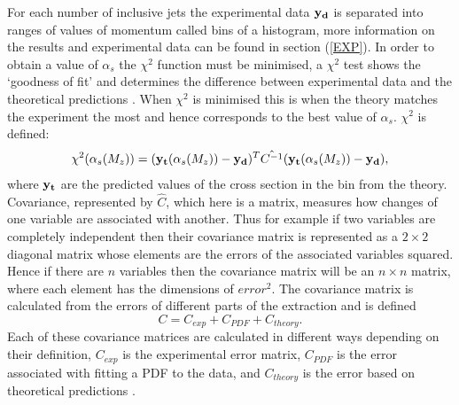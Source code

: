 \documentclass[12pt, onecolumn, nofootinbib]{revtex4}    %
\begin{document}
For each number of inclusive jets the experimental data ${\bold{y_d}}$ is separated into ranges of values of momentum called bins of a histogram, more information on the results and experimental data can be found in section (\ref{EXP}). In order to obtain a value of ${\alpha_s}$ the ${\chi^2}$ function must be minimised, a ${\chi^2}$ test shows the `goodness of fit' and determines the difference between experimental data and the theoretical predictions \cite{STAT}. When ${\chi^2}$ is minimised this is when the theory matches the experiment the most and hence corresponds to the best value of ${\alpha_s}$. ${\chi^2}$  is defined:  \begin{equation} \chi^2(\alpha_s(M_z)) = (\bold{y_t}(\alpha_s(M_z))-\bold{y_d})^T\hat{C^{-1}}(\bold{y_t}(\alpha_s(M_z))-\bold{y_d}), \end{equation} where ${\bold{y_t}}$ are the predicted values of the cross section in the bin from the theory. Covariance, represented by ${\hat{C}}$, which here is a matrix, measures how changes of one variable are associated with another. Thus for example if two variables are completely independent then their covariance matrix is represented as a ${2\times2}$ diagonal matrix whose elements are the errors of the associated variables squared. Hence if there are ${n}$ variables then the covariance matrix will be an ${n\times n}$ matrix, where each element has the dimensions of ${error^2}$. The covariance matrix is calculated from the errors of different parts of the extraction and is defined \begin{equation} C = C_{exp} + C_{PDF} + C_{theory}. \end{equation} Each of these covariance matrices are calculated in different ways depending on their definition, ${C_{exp}}$ is the experimental error matrix, ${C_{PDF}}$ is the error associated with fitting a PDF to the data, and ${C_{theory}}$ is the error based on theoretical predictions \cite{DMP}. 
\end{document}
